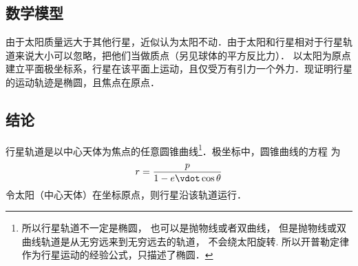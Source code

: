 

\subsection{数学模型}
由于太阳质量远大于其他行星，近似认为太阳不动．由于太阳和行星相对于行星轨道来说大小可以忽略，把他们当做质点（另见球体的平方反比力）．%
以太阳为原点建立平面极坐标系，行星在该平面上运动，且仅受万有引力一个外力．现证明行星的运动轨迹是椭圆，且焦点在原点．

\subsection{结论}
行星轨道是以中心天体为焦点的任意圆锥曲线\footnote{所以行星轨道不一定是椭圆， 也可以是抛物线或者双曲线， 但是抛物线或双曲线轨道是从无穷远来到无穷远去的轨道， 不会绕太阳旋转. 所以开普勒定律作为行星运动的经验公式，只描述了椭圆．}．极坐标中，圆锥曲线的方程
为
\begin{equation}\label{Keple1_eq1}
r = \frac{p}{{1 - e \vdot \cos \theta }}
\end{equation}
令太阳（中心天体）在坐标原点，则行星沿该轨道运行．



